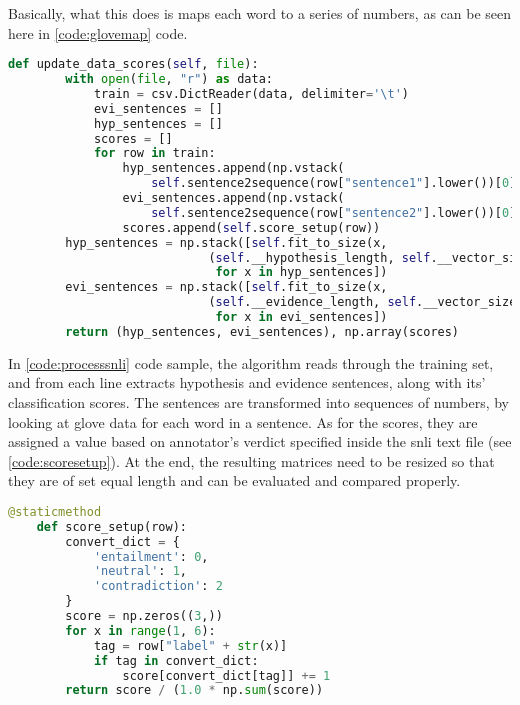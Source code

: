             Basically, what this does is maps each word to a series of numbers, as can be seen here in \cref{code:glovemap} code.
            
            \begin{lstlisting}[language=Python, caption=Processing SNLI Data Set, label=code:processsnli]
    def update_data_scores(self, file):
        with open(file, "r") as data:
            train = csv.DictReader(data, delimiter='\t')
            evi_sentences = []
            hyp_sentences = []
            scores = []
            for row in train:
                hyp_sentences.append(np.vstack(
                    self.sentence2sequence(row["sentence1"].lower())[0]))
                evi_sentences.append(np.vstack(
                    self.sentence2sequence(row["sentence2"].lower())[0]))
                scores.append(self.score_setup(row))
        hyp_sentences = np.stack([self.fit_to_size(x, 
                            (self.__hypothesis_length, self.__vector_size))
                             for x in hyp_sentences])
        evi_sentences = np.stack([self.fit_to_size(x, 
                            (self.__evidence_length, self.__vector_size))
                             for x in evi_sentences])
        return (hyp_sentences, evi_sentences), np.array(scores)
            \end{lstlisting}
            \FloatBarrier
            
            In \cref{code:processsnli} code sample, the algorithm reads through the training set, and from each line extracts hypothesis and evidence sentences, along with its' classification scores. The sentences are transformed into sequences of numbers, by looking at \gls{glove} data for each word in a sentence. As for the scores, they are assigned a value based on annotator's verdict specified inside the \gls{snli} text file (see \cref{code:scoresetup}). At the end, the resulting matrices need to be resized so that they are of set equal length and can be evaluated and compared properly.
            
            \begin{lstlisting}[language=Python, caption=Classification Score Setup, label=code:scoresetup]
    @staticmethod
    def score_setup(row):
        convert_dict = {
            'entailment': 0,
            'neutral': 1,
            'contradiction': 2
        }
        score = np.zeros((3,))
        for x in range(1, 6):
            tag = row["label" + str(x)]
            if tag in convert_dict:
                score[convert_dict[tag]] += 1
        return score / (1.0 * np.sum(score))
            \end{lstlisting}
            \FloatBarrier
            
